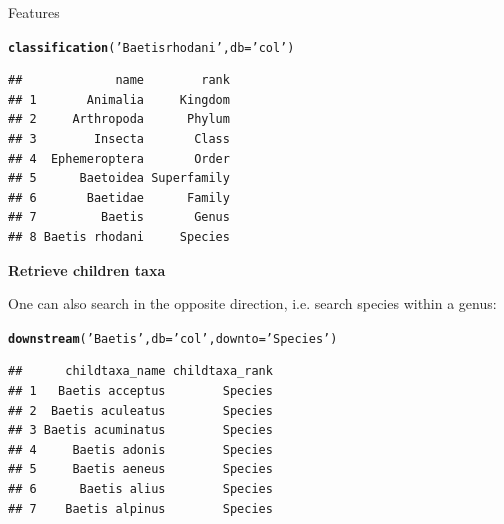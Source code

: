 \documentclass[final,t]{beamer}\usepackage[]{graphicx}\usepackage[]{color}
\makeatletter
\newcommand{\hlstr}[1]{\textcolor[rgb]{0.192,0.494,0.8}{#1}}%
\newcommand{\hlstd}[1]{\textcolor[rgb]{0.345,0.345,0.345}{#1}}%
\newcommand{\hlkwc}[1]{\textcolor[rgb]{0.333,0.667,0.333}{#1}}%
\newcommand{\hlkwd}[1]{\textcolor[rgb]{0.737,0.353,0.396}{\textbf{#1}}}%
\newenvironment{kframe}{%
 \def\at@end@of@kframe{}%
 \ifinner\ifhmode%
  \def\at@end@of@kframe{\end{minipage}}%
  \begin{minipage}{\columnwidth}%
 \fi\fi%
 \def\FrameCommand##1{\hskip\@totalleftmargin \hskip-\fboxsep
 \colorbox{shadecolor}{##1}\hskip-\fboxsep
     \hskip-\linewidth \hskip-\@totalleftmargin \hskip\columnwidth}%
 \MakeFramed {\advance\hsize-\width
   \@totalleftmargin\z@ \linewidth\hsize
   \@setminipage}}%
 {\par\unskip\endMakeFramed%
 \at@end@of@kframe}
\newenvironment{knitrout}{}{} %
\renewenvironment{knitrout}{}{\vspace{-1.8em}}
\makeatother
\begin{document}
\begin{frame}[fragile]
\begin{columns}[t]
\begin{column}{.485\linewidth}
\begin{block}{Features}
\begin{knitrout}\footnotesize
{}\color{fgcolor}\begin{kframe}
\begin{alltt}
\hlkwd{classification}\hlstd{(}\hlstr{'Baetis rhodani'}\hlstd{,} \hlkwc{db} \hlstd{=} \hlstr{'col'}\hlstd{)}
\end{alltt}
\end{kframe}
\end{knitrout}
\begin{knitrout}\footnotesize
{}\color{fgcolor}\begin{kframe}
\begin{verbatim}
##             name        rank
## 1       Animalia     Kingdom
## 2     Arthropoda      Phylum
## 3        Insecta       Class
## 4  Ephemeroptera       Order
## 5      Baetoidea Superfamily
## 6       Baetidae      Family
## 7         Baetis       Genus
## 8 Baetis rhodani     Species
\end{verbatim}
\end{kframe}
\end{knitrout}
\vspace{2em}

\textcolor{i6bluedark}{\textbf{\large Retrieve children taxa}}
        \vspace{0.5em}
        \par
        \begingroup
        \leftskip=2cm
        \noindent 
          One can also search in the opposite direction, i.e. search species within a genus:
        \par
        \endgroup
\begin{knitrout}\footnotesize
{}\color{fgcolor}\begin{kframe}
\begin{alltt}
\hlkwd{downstream}\hlstd{(}\hlstr{'Baetis'}\hlstd{,} \hlkwc{db} \hlstd{=} \hlstr{'col'}\hlstd{,} \hlkwc{downto} \hlstd{=} \hlstr{'Species'}\hlstd{)}
\end{alltt}
\end{kframe}
\end{knitrout}
\begin{knitrout}\footnotesize
{}\color{fgcolor}\begin{kframe}
\begin{verbatim}
##      childtaxa_name childtaxa_rank
## 1   Baetis acceptus        Species
## 2  Baetis aculeatus        Species
## 3 Baetis acuminatus        Species
## 4     Baetis adonis        Species
## 5     Baetis aeneus        Species
## 6      Baetis alius        Species
## 7    Baetis alpinus        Species
\end{verbatim}
\end{kframe}
\end{knitrout}
\vspace{2em}


\end{block}
\end{column}
\end{columns}
\end{frame}
\end{document}
